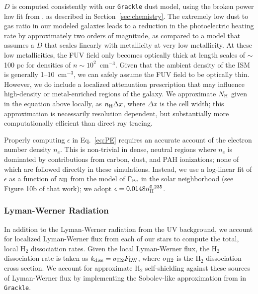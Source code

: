 \documentclass[twocolumn]{aastex61}
\newcommand{\ccunit}{cm$^{-3}$}
\begin{document}
$D$ is computed consistently with our \texttt{Grackle} dust model, using the broken power law fit from \citet{Remy-Ruyer2014}, as described in Section~\ref{sec:chemistry}. The extremely low dust to gas ratio in our modeled galaxies leads to a reduction in the photoelectric heating rate by approximately two orders of magnitude, as compared to a model that assumes a $D$ that scales linearly with metallicity at very low metallicity. At these low metallicities, the FUV field only becomes optically thick at length scales of $\sim$ 100 pc for densities of $n \sim 10^2$~\ccunit. Given that the ambient density of the ISM is generally 1--10~cm$^{-3}$, we can safely assume the FUV field to be optically thin. However, we do include a localized attenuation prescription that may influence high-density or metal-enriched regions of the galaxy. We approximate $N_{\rm H}$ given in the equation above locally, as $n_{\rm H}\Delta x$, where $\Delta x$ is the cell width; this approximation is necessarily resolution dependent, but substantially more computationally efficient than direct ray tracing.

Properly computing $\epsilon$ in Eq.~\ref{eq:PE} requires an accurate account of the electron number density $n_e$. This is non-trivial in dense, neutral regions where $n_e$ is dominated by contributions from carbon, dust, and PAH ionizations; none of which are followed directly in these simulations. Instead, we use a log-linear fit of $\epsilon$ as a function of $n_{\rm H}$ from the \citet{Wolfire2003} model of $\Gamma_{\rm{Pe}}$ in the solar neighborhood (see Figure 10b of that work); we adopt $\epsilon = 0.0148n_{\rm{H}}^{0.235}$. %

\subsubsection{Lyman-Werner Radiation}
\label{sec:LW}
In addition to the Lyman-Werner radiation from the UV background, we account for localized Lyman-Werner flux from each of our stars to compute the total, local H$_2$ dissociation rates. Given the local Lyman-Werner flux, the H$_2$ dissociation rate is taken as $k_{\rm diss} = \sigma_{\rm H2} F_{\rm LW}$, where $\sigma_{\rm H2}$ is the H$_2$ dissociation cross section. We account for approximate H$_2$ self-shielding against these sources of Lyman-Werner flux by implementing the Sobolev-like approximation from \citet{Wolcott-Green2011} in \texttt{Grackle}. 
\end{document}

